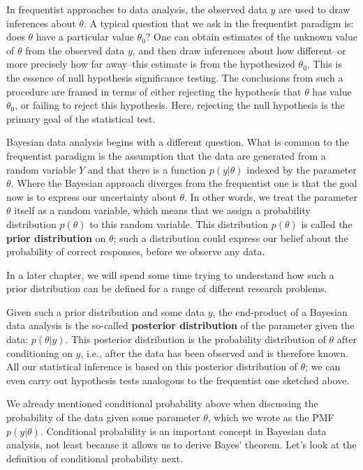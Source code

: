 \documentclass[12pt,]{krantz}
\begin{document}
In frequentist approaches to data analysis, the observed data \(y\) are used to draw inferences about \(\theta\). A typical question that we ask in the frequentist paradigm is: does \(\theta\) have a particular value \(\theta_0\)? One can obtain estimates of the unknown value of \(\theta\) from the observed data \(y\), and then draw inferences about how different--or more precisely how far away--this estimate is from the hypothesized \(\theta_0\). This is the essence of null hypothesis significance testing. The conclusions from such a procedure are framed in terms of either rejecting the hypothesis that \(\theta\) has value \(\theta_0\), or failing to reject this hypothesis. Here, rejecting the null hypothesis is the primary goal of the statistical test.

Bayesian data analysis begins with a different question. What is common to the frequentist paradigm is the assumption that the data are generated from a random variable \(Y\) and that there is a function \(p(y|\theta)\) indexed by the parameter \(\theta\). Where the Bayesian approach diverges from the frequentist one is that the goal now is to express our uncertainty about \(\theta\). In other words, we treat the parameter \(\theta\) itself as a random variable, which means that we assign a probability distribution \(p(\theta)\) to this random variable. This distribution \(p(\theta)\) is called the \textbf{prior distribution} on \(\theta\); such a distribution could express our belief about the probability of correct responses, before we observe any data.

In a later chapter, we will spend some time trying to understand how such a prior distribution can be defined for a range of different research problems.

Given such a prior distribution and some data \(y\), the end-product of a Bayesian data analysis is the so-called \textbf{posterior distribution} of the parameter given the data: \(p(\theta | y)\). This posterior distribution is the probability distribution of \(\theta\) after conditioning on \(y\), i.e., after the data has been observed and is therefore known. All our statistical inference is based on this posterior distribution of \(\theta\); we can even carry out hypothesis tests analogous to the frequentist one sketched above.

We already mentioned conditional probability above when discussing the probability of the data given some parameter \(\theta\), which we wrote as the PMF \(p(y|\theta)\). Conditional probability is an important concept in Bayesian data analysis, not least because it allows us to derive Bayes' theorem. Let's look at the definition of conditional probability next.
\end{document}
